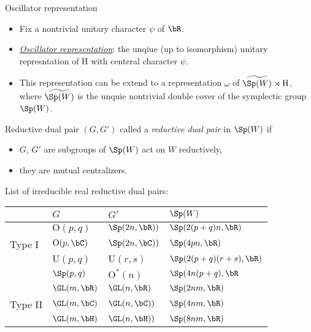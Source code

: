 \documentclass[final,hyperref={pdfpagelabels=false}]{beamer} %
\def\emph#1{{\em \underline{#1}}}
\begin{document}
\begin{frame}
\begin{columns}[t]
\begin{column}{.48\linewidth}
\begin{block}{Oscillator representation}
\begin{itemize}
        \item Fix a nontrivial unitary character $\psi$ of $\bR$. 
        \item \emph{Oscillator representation}: the unqiue (up to isomorphism) unitary represntation of $\mathrm{H}$ with centeral character $\psi$.
        \item This representation can be extend to a representation $\omega$ of 
          $\widetilde{\Sp(W)}\rtimes \mathrm{H}$, where
          $\widetilde{\Sp(W)}$ is  the unquie nontrivial double cover of the symplectic group $\Sp(W)$.
        \end{itemize}
      \end{block}
      \vfill
      \begin{block}{Reductive dual pair}
        $(G,G')$ called a {\em reductive dual pair} in $\Sp(W)$ if
        \begin{itemize}
        \item $G$, $G'$  are subgroups of $\Sp(W)$ act on $W$ reductively,
        \item they are mutual centralizers.
        \end{itemize}
        List of irreducible real reductive dual pairs:
       \begin{center}\small
        \begin{tabular}{ l |lll }
           & $G$ & $G'$ & $\Sp(W)$\\
          \hline
           & $\mathrm{O}(p,q)$ & $\Sp(2n,\bR))$ &$\Sp(2(p+q)n,\bR)$\\
           Type I & $\mathrm{O}(p,\bC)$ & $\Sp(2n,\bC))$ &$\Sp(4pn,\bR)$\\
          & $\mathrm{U}(p,q)$ & $\mathrm{U}(r,s)$ & $\Sp(2(p+q)(r+s),\bR)$\\ 
          & $\Sp(p,q)$& $\mathrm{O}^*(n)$ & $\Sp(4n(p+q),\bR$\\
          \hline
          &$\GL(m,\bR)$ & $\GL(n,\bR)$& $\Sp(2nm,\bR)$\\
         Type II &$\GL(m,\bC)$& $\GL(n,\bC))$& $\Sp(4nm,\bR)$ \\
          &$\GL(m,\bH)$& $\GL(n,\bH))$& $\Sp(8nm,\bR)$
        \end{tabular}
      \end{center}
    \end{block}


\end{column}
\end{columns}
\end{frame}
\end{document}
